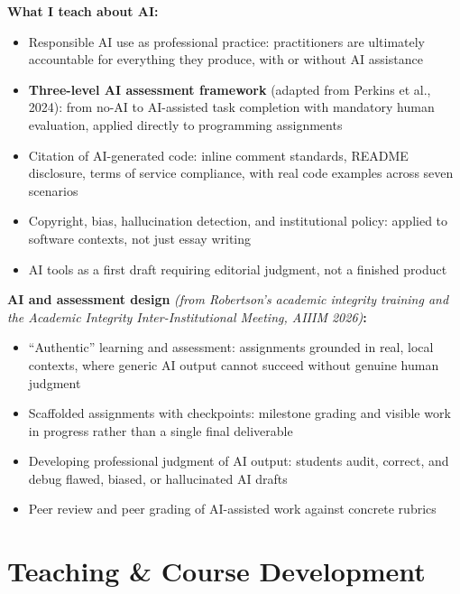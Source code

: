 \documentclass[10pt]{article}
\begin{document}
\textbf{What I teach about AI:}
\begin{itemize}
    \item Responsible AI use as professional practice: practitioners are ultimately accountable for everything they produce, with or without AI assistance
    \item \textbf{Three-level AI assessment framework} (adapted from Perkins et al., 2024): from no-AI to AI-assisted task completion with mandatory human evaluation, applied directly to programming assignments
    \item Citation of AI-generated code: inline comment standards, README disclosure, terms of service compliance, with real code examples across seven scenarios
    \item Copyright, bias, hallucination detection, and institutional policy: applied to software contexts, not just essay writing
    \item AI tools as a first draft requiring editorial judgment, not a finished product
\end{itemize}

\textbf{AI and assessment design} \textit{\small(from Robertson's academic integrity training and the Academic Integrity Inter-Institutional Meeting, AIIIM 2026)}\textbf{:}
\begin{itemize}
    \item ``Authentic'' learning and assessment: assignments grounded in real, local contexts, where generic AI output cannot succeed without genuine human judgment
    \item Scaffolded assignments with checkpoints: milestone grading and visible work in progress rather than a single final deliverable
    \item Developing professional judgment of AI output: students audit, correct, and debug flawed, biased, or hallucinated AI drafts
    \item Peer review and peer grading of AI-assisted work against concrete rubrics
\end{itemize}

\section*{Teaching \& Course Development}
\end{document}
